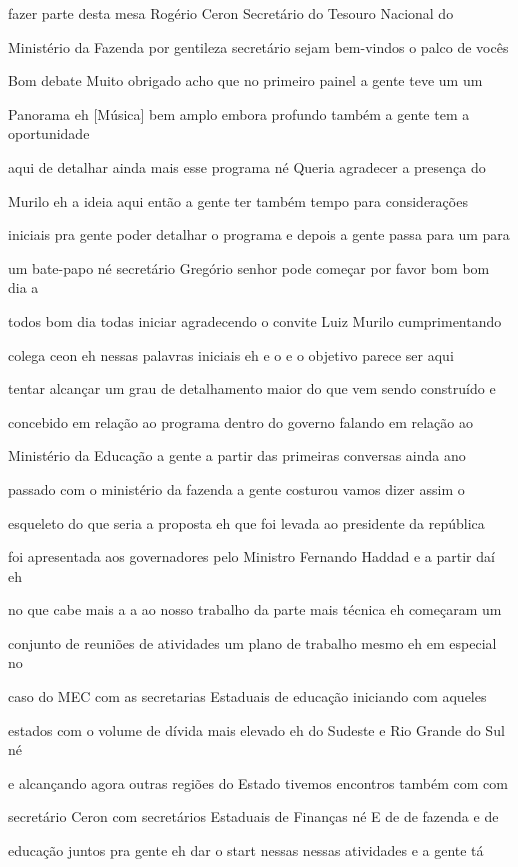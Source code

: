 \documentclass[a4paper,12pt]{article}
\begin{document}
fazer parte desta mesa Rogério Ceron Secretário do Tesouro Nacional do

Ministério da Fazenda por gentileza secretário sejam bem-vindos o palco de vocês

Bom debate Muito obrigado acho que no primeiro painel a gente teve um um

Panorama eh [Música] bem amplo embora profundo também a gente tem a oportunidade

aqui de detalhar ainda mais esse programa né Queria agradecer a presença do

Murilo eh a ideia aqui então a gente ter também tempo para considerações

iniciais pra gente poder detalhar o programa e depois a gente passa para um para

um bate-papo né secretário Gregório senhor pode começar por favor bom bom dia a

todos bom dia todas iniciar agradecendo o convite Luiz Murilo cumprimentando

colega ceon eh nessas palavras iniciais eh e o e o objetivo parece ser aqui

tentar alcançar um grau de detalhamento maior do que vem sendo construído e

concebido em relação ao programa dentro do governo falando em relação ao

Ministério da Educação a gente a partir das primeiras conversas ainda ano

passado com o ministério da fazenda a gente costurou vamos dizer assim o

esqueleto do que seria a proposta eh que foi levada ao presidente da república

foi apresentada aos governadores pelo Ministro Fernando Haddad e a partir daí eh

no que cabe mais a a ao nosso trabalho da parte mais técnica eh começaram um

conjunto de reuniões de atividades um plano de trabalho mesmo eh em especial no

caso do MEC com as secretarias Estaduais de educação iniciando com aqueles

estados com o volume de dívida mais elevado eh do Sudeste e Rio Grande do Sul né

e alcançando agora outras regiões do Estado tivemos encontros também com com

secretário Ceron com secretários Estaduais de Finanças né E de de fazenda e de

educação juntos pra gente eh dar o start nessas nessas atividades e a gente tá
\end{document}
